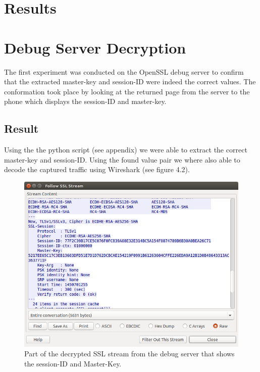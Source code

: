 \documentclass[12pt, a4paper]{report}
\begin{document}
\clearpage

\section{Results}



\section{Debug Server Decryption}

The first experiment was conducted on the OpenSSL debug server to confirm that the extracted master-key and session-ID were indeed the correct values. The conformation took place by looking at the returned page from the server to the phone which displays the session-ID and master-key. 



\subsection{Result}

Using the the python script (see appendix) we were able to extract the correct master-key and session-ID. Using the found value pair we where also able to decode the captured traffic using Wireshark (see figure 4.2).


\begin{figure}[h]
\centering
  \includegraphics[scale=0.5]{images/debug.png}
  \caption{Part of the decrypted SSL stream from the debug server that shows the session-ID and Master-Key.}
\end{figure}
\end{document}
